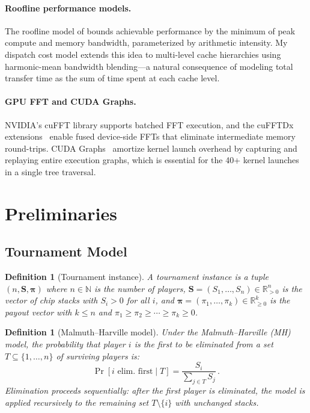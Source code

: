\documentclass[11pt]{article}
\newtheorem{definition}[theorem]{Definition}
\begin{document}
\paragraph{Roofline performance models.}
The roofline model of \citet{williams2009} bounds achievable performance
by the minimum of peak compute and memory bandwidth, parameterized by
arithmetic intensity. My dispatch cost model extends this idea to
multi-level cache hierarchies using harmonic-mean bandwidth blending---a
natural consequence of modeling total transfer time as the sum of
time spent at each cache level.

\paragraph{GPU FFT and CUDA Graphs.}
NVIDIA's cuFFT library supports batched FFT execution, and the cuFFTDx
extensions~\citep{nvidia2024cufftdx} enable fused device-side FFTs
that eliminate intermediate memory round-trips. CUDA
Graphs~\citep{nvidia2024cudagraphs} amortize kernel launch overhead by
capturing and replaying entire execution graphs, which is essential for
the 40+ kernel launches in a single tree traversal.


\section{Preliminaries}\label{sec:prelim}

\subsection{Tournament Model}

\begin{definition}[Tournament instance]
A \emph{tournament instance} is a tuple $(n, \bm{S}, \bm{\pi})$ where
$n \in \mathbb{N}$ is the number of players, $\bm{S} = (S_1, \ldots, S_n)
\in \mathbb{R}_{>0}^n$ is the vector of chip stacks with $S_i > 0$ for all
$i$, and $\bm{\pi} = (\pi_1, \ldots, \pi_k) \in \mathbb{R}_{\geq 0}^k$
is the payout vector with $k \leq n$ and $\pi_1 \geq \pi_2 \geq \cdots
\geq \pi_k \geq 0$.
\end{definition}

\begin{definition}[Malmuth--Harville model]\label{def:mh}
Under the Malmuth--Harville (MH) model, the probability that player $i$ is
the first to be eliminated from a set $T \subseteq \{1, \ldots, n\}$ of
surviving players is:
\begin{equation}\label{eq:mh-elim}
  \Pr[i \text{ elim.\ first} \mid T] = \frac{S_i}{\sum_{j \in T} S_j}\,.
\end{equation}
Elimination proceeds sequentially: after the first player is eliminated, the
model is applied recursively to the remaining set $T \setminus \{i\}$ with
unchanged stacks.
\end{definition}
\end{document}
